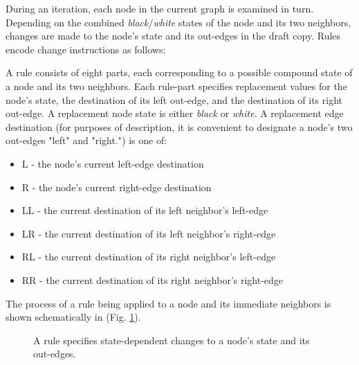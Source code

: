 \documentclass[twoside,twocolumn]{article}
\begin{document}
During an iteration, each node in the current graph is examined in turn.
Depending on the combined \textit{black}/\textit{white}
states of the node and its two neighbors, changes are made to the node's
state and its out-edges in the draft copy. Rules encode change
instructions as follows:

A rule consists of eight parts, each corresponding to a possible compound state of a node and its
two neighbors. Each rule-part specifies replacement values for
the node's state, the destination of its left out-edge, and the destination of its right
out-edge. A replacement node state is either \textit{black} or \textit{white}.
A replacement edge destination
(for purposes of description, it is convenient to designate a node's two out-edges "left" and "right.")
is one of:

\begin{itemize}
    \item L - the node's current left-edge destination
    \item R - the node's current right-edge destination
    \item LL - the current destination of its left neighbor's left-edge
    \item LR - the current destination of its left neighbor's right-edge
    \item RL - the current destination of its right neighbor's left-edge
    \item RR - the current destination of its right neighbor's right-edge
\end{itemize}
The process of a rule being applied to a node and its immediate neighbors is shown
schematically in (Fig. \ref{fig:Fig1}).

\begin{figure}[tb] 
    \centering
    \caption{A rule specifies state-dependent changes to a node's state and its out-edges.}
    \label{fig:Fig1}
\end{figure}
\end{document}
